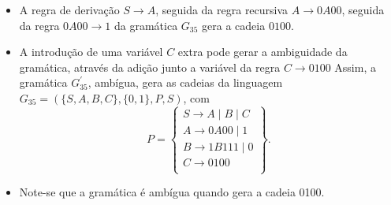 \documentclass[12pt]{article}
\def\myling{{35}} %
\begin{document}
\begin{tcolorbox}[breakable,rounded corners, colback=yellow!5, colframe=red!40!black, title={$G^\prime_{\myling}$ não ambígua.}]
 \begin{itemize}
  \item A regra de derivação $S\to A$, seguida da regra recursiva $A\to 0A00$, seguida da regra $0A00 \to 1$ da gramática $G_{\myling}$ gera a cadeia $0100$.
  \item A introdução de uma variável $C$ extra pode gerar a ambiguidade da gramática, através da adição junto a variável da regra $C \to 0100$ Assim, a gramática $G^\prime_{\myling}$, ambígua, gera as cadeias da linguagem $G_{\myling}=(\{S,A,B,C\},\{0,1\},P,S)$, com
  $$
   P =
   \left\{\begin{array}{l}
    S\to A\mid B \mid C\\
    A\to 0A00\mid 1\\
    B\to 1B111\mid 0\\
    C\to 0100\\
   \end{array}\right\}.
  $$
  \item Note-se que a gramática é ambígua quando gera a cadeia 0100.
 \end{itemize}
\end{tcolorbox}
\end{document}
